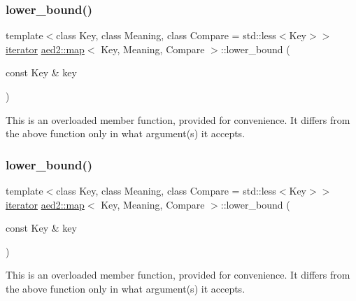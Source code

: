 \subsubsection{\texorpdfstring{lower\+\_\+bound()}{lower\_bound()}\hspace{0.1cm}{\footnotesize\ttfamily [3/4]}}
{\footnotesize\ttfamily template$<$class Key, class Meaning, class Compare = std\+::less$<$\+Key$>$$>$ \\
\hyperlink{classaed2_1_1map_1_1iterator}{iterator} \hyperlink{classaed2_1_1map}{aed2\+::map}$<$ Key, Meaning, Compare $>$\+::lower\+\_\+bound (\begin{DoxyParamCaption}\item[{const Key \&}]{key }\end{DoxyParamCaption})\hspace{0.3cm}{\ttfamily [inline]}}

This is an overloaded member function, provided for convenience. It differs from the above function only in what argument(s) it accepts. \mbox{\label{classaed2_1_1map_a07b3dd65557c59ee085e5f211269c6b3}} 
\subsubsection{\texorpdfstring{lower\+\_\+bound()}{lower\_bound()}\hspace{0.1cm}{\footnotesize\ttfamily [4/4]}}
{\footnotesize\ttfamily template$<$class Key, class Meaning, class Compare = std\+::less$<$\+Key$>$$>$ \\
\hyperlink{classaed2_1_1map_1_1iterator}{iterator} \hyperlink{classaed2_1_1map}{aed2\+::map}$<$ Key, Meaning, Compare $>$\+::lower\+\_\+bound (\begin{DoxyParamCaption}\item[{const Key \&}]{key }\end{DoxyParamCaption})\hspace{0.3cm}{\ttfamily [inline]}}

This is an overloaded member function, provided for convenience. It differs from the above function only in what argument(s) it accepts. \mbox{\label{classaed2_1_1map_ac606d334809066929522964d45e76317}} 

